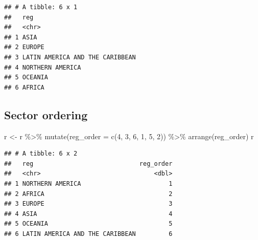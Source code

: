 \documentclass[
]{book}
\newenvironment{Shaded}{\begin{snugshade}}{\end{snugshade}}
\newcommand{\AttributeTok}[1]{\textcolor[rgb]{0.77,0.63,0.00}{#1}}
\newcommand{\CommentTok}[1]{\textcolor[rgb]{0.56,0.35,0.01}{\textit{#1}}}
\newcommand{\DecValTok}[1]{\textcolor[rgb]{0.00,0.00,0.81}{#1}}
\newcommand{\FunctionTok}[1]{\textcolor[rgb]{0.00,0.00,0.00}{#1}}
\newcommand{\NormalTok}[1]{#1}
\newcommand{\OtherTok}[1]{\textcolor[rgb]{0.56,0.35,0.01}{#1}}
\newcommand{\SpecialCharTok}[1]{\textcolor[rgb]{0.00,0.00,0.00}{#1}}
\begin{document}
\begin{Shaded}
\end{Shaded}

\begin{verbatim}
## # A tibble: 6 x 1
##   reg                            
##   <chr>                          
## 1 ASIA                           
## 2 EUROPE                         
## 3 LATIN AMERICA AND THE CARIBBEAN
## 4 NORTHERN AMERICA               
## 5 OCEANIA                        
## 6 AFRICA
\end{verbatim}

\hypertarget{sector-ordering-1}{%
\subsection{Sector ordering}\label{sector-ordering-1}}

\begin{Shaded}
\begin{Highlighting}[]
\NormalTok{r }\OtherTok{\textless{}{-}}\NormalTok{ r }\SpecialCharTok{\%\textgreater{}\%}
  \FunctionTok{mutate}\NormalTok{(}\AttributeTok{reg\_order =} \FunctionTok{c}\NormalTok{(}\DecValTok{4}\NormalTok{, }\DecValTok{3}\NormalTok{, }\DecValTok{6}\NormalTok{, }\DecValTok{1}\NormalTok{, }\DecValTok{5}\NormalTok{, }\DecValTok{2}\NormalTok{)) }\SpecialCharTok{\%\textgreater{}\%}
  \FunctionTok{arrange}\NormalTok{(reg\_order)}
\NormalTok{r}
\end{Highlighting}
\end{Shaded}

\begin{verbatim}
## # A tibble: 6 x 2
##   reg                             reg_order
##   <chr>                               <dbl>
## 1 NORTHERN AMERICA                        1
## 2 AFRICA                                  2
## 3 EUROPE                                  3
## 4 ASIA                                    4
## 5 OCEANIA                                 5
## 6 LATIN AMERICA AND THE CARIBBEAN         6
\end{verbatim}

\begin{Shaded}
\end{Shaded}
\end{document}
